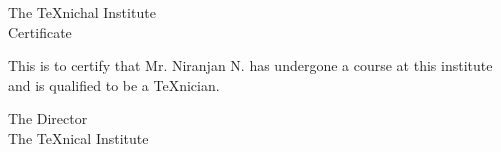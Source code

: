 \documentclass{article}
\begin{document}
\begin{center}
The \TeX nichal Institute\\[.75cm]
Certificate
\end{center}

\noindent
This is to certify that Mr. Niranjan N. has undergone a
course at this institute and is qualified to be a \TeX nician.

\begin{flushright}
The Director\\
The \TeX nical Institute
\end{flushright}
\end{document}
